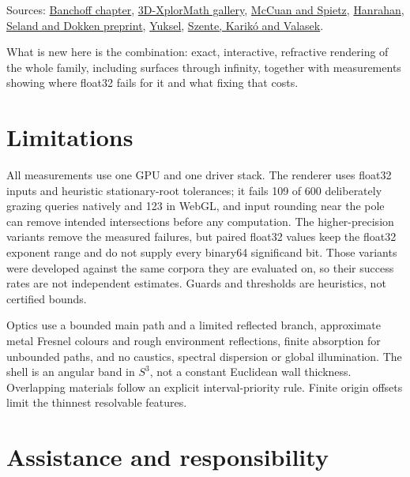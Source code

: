 \documentclass[11pt,a4paper]{article}
\begin{document}
Sources:
\href{https://www.math.brown.edu/tbanchof/Beyond3D.new/chapter6/s6_8.html}{Banchoff
chapter},
\href{https://webapps.math.uci.edu/~vmm/Surface/clifford_torus/clifford_torus.html}{3D-XplorMath
gallery}, \href{https://arxiv.org/abs/math/9810023}{McCuan and Spietz},
\href{https://www.cs.drexel.edu/~deb39/Classes/Papers/p83-hanrahan.pdf}{Hanrahan},
\href{https://www.sintef.no/globalassets/project/heterogeneous-computing/preprints/algebraic_surface_springer.pdf}{Seland
and Dokken preprint},
\href{https://www.cemyuksel.com/research/polynomials/polynomial_roots_hpg2022.pdf}{Yuksel},
\href{https://www.researchgate.net/publication/410684146_Robust_Ray-Surface_Intersections_for_Algebraic_Surfaces}{Szente,
Karikó and Valasek}.

What is new here is the combination: exact, interactive, refractive
rendering of the whole family, including surfaces through infinity,
together with measurements showing where float32 fails for it and what
fixing that costs.

\section{Limitations}\label{limitations}

All measurements use one GPU and one driver stack. The renderer uses
float32 inputs and heuristic stationary-root tolerances; it fails 109 of
600 deliberately grazing queries natively and 123 in WebGL, and input
rounding near the pole can remove intended intersections before any
computation. The higher-precision variants remove the measured failures,
but paired float32 values keep the float32 exponent range and do not
supply every binary64 significand bit. Those variants were developed
against the same corpora they are evaluated on, so their success rates
are not independent estimates. Guards and thresholds are heuristics, not
certified bounds.

Optics use a bounded main path and a limited reflected branch,
approximate metal Fresnel colours and rough environment reflections,
finite absorption for unbounded paths, and no caustics, spectral
dispersion or global illumination. The shell is an angular band in
\(S^3\), not a constant Euclidean wall thickness. Overlapping materials
follow an explicit interval-priority rule. Finite origin offsets limit
the thinnest resolvable features.

\section*{Assistance and
responsibility}\label{assistance-and-responsibility}
\end{document}
